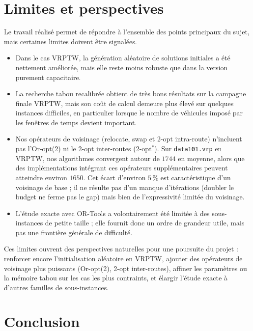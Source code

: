 \documentclass[11pt,a4paper]{article}
\begin{document}
\section{Limites et perspectives}
\label{sec:limites}

Le travail réalisé permet de répondre à l'ensemble des points principaux du sujet, mais certaines limites doivent être signalées.
\begin{itemize}
    \item Dans le cas VRPTW, la génération aléatoire de solutions initiales a été nettement améliorée, mais elle reste moins robuste que dans la version purement capacitaire.
    \item La recherche tabou recalibrée obtient de très bons résultats sur la campagne finale VRPTW, mais son coût de calcul demeure plus élevé sur quelques instances difficiles, en particulier lorsque le nombre de véhicules imposé par les fenêtres de temps devient important.
    \item Nos opérateurs de voisinage (relocate, swap et 2-opt intra-route) n'incluent pas l'Or-opt(2) ni le 2-opt inter-routes (2-opt$^*$). Sur \texttt{data101.vrp} en VRPTW, nos algorithmes convergent autour de \(1744\) en moyenne, alors que des implémentations intégrant ces opérateurs supplémentaires peuvent atteindre environ \(1650\). Cet écart d'environ \(5\,\%\) est caractéristique d'un voisinage de base ; il ne résulte pas d'un manque d'itérations (doubler le budget ne ferme pas le gap) mais bien de l'expressivité limitée du voisinage.
    \item L'étude exacte avec OR-Tools a volontairement été limitée à des sous-instances de petite taille ; elle fournit donc un ordre de grandeur utile, mais pas une frontière générale de difficulté.
\end{itemize}

Ces limites ouvrent des perspectives naturelles pour une poursuite du projet : renforcer encore l'initialisation aléatoire en VRPTW, ajouter des opérateurs de voisinage plus puissants (Or-opt(2), 2-opt inter-routes), affiner les paramètres ou la mémoire tabou sur les cas les plus contraints, et élargir l'étude exacte à d'autres familles de sous-instances.

\section{Conclusion}
\end{document}
